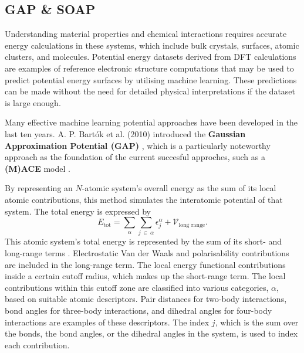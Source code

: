 \subsection{GAP \& SOAP} \label{subsec:2.4.2}
Understanding material properties and chemical interactions requires accurate energy calculations in these systems, which include bulk crystals, surfaces, atomic clusters, and molecules.
Potential energy datasets derived from DFT calculations are examples of reference electronic structure computations that may be used to predict potential energy surfaces by utilising machine learning. These predictions can be made without the need for detailed physical interpretations \cite{Bartk2010} if the dataset is large enough.

Many effective machine learning potential approaches have been developed in the last ten years. 
A. P. Bartók et al. (2010) introduced the \textbf{Gaussian Approximation Potential (GAP)} \cite{Bartk2010, Bartk2015}, which is a particularly noteworthy approach as the foundation of the current succesful approches, such as a \textbf{(M)ACE} model \cite{Drautz2019, Dusson2022, Witt2023, Batatia2025}.

By representing an $N$-atomic system's overall energy as the sum of its local atomic contributions, this method simulates the interatomic potential of that system.
The total energy is expressed by
\begin{equation}
    \label{equ:2.46}
     E_{\text{tot}} = \sum_{\alpha}\sum_{j\:\in\:\alpha}\epsilon_{j}^{\alpha} + \mathcal{V}_{\text{long range}}.
\end{equation}
This atomic system's total energy is represented by the sum of its short- and long-range terms \cite{Bartk2015, Bartk2013, Deringer2021}. 
Electrostatic Van der Waals and polarisability contributions are included in the long-range term.
The local energy functional contributions inside a certain cutoff radius, which makes up the short-range term.
The local contributions within this cutoff zone are classified into various categories, $\alpha$, based on suitable atomic descriptors.
Pair distances for two-body interactions, bond angles for three-body interactions, and dihedral angles for four-body interactions are examples of these descriptors.
The index $j$, which is the sum over the bonds, the bond angles, or the dihedral angles in the system, is used to index each contribution.

